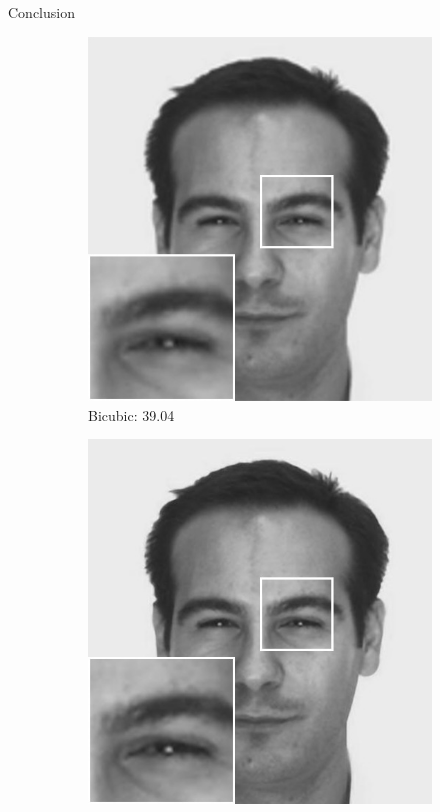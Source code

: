 \begin{frame}{Conclusion}{}
{\begin{figure}
\begin{subfigure}[b]{0.235\textwidth}
                \includegraphics[width=\textwidth]{sections/malte_slides/915-bic.jpg}
                \caption*{\scriptsize Bicubic: 39.04}
            \end{subfigure}
            \begin{subfigure}[b]{0.235\textwidth}
                \includegraphics[width=\textwidth]{sections/malte_slides/srcnn955.jpg}

\end{subfigure}
\end{figure}}
\end{frame}
